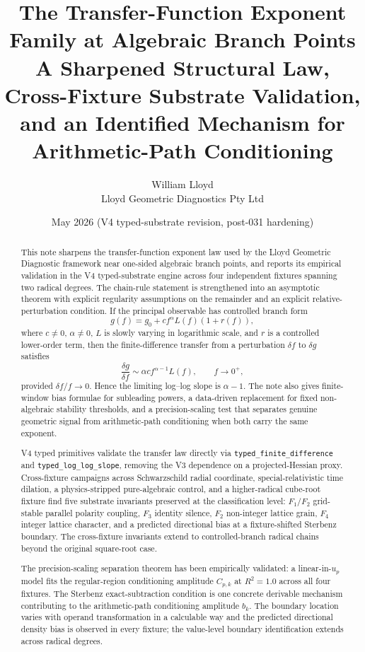 \documentclass[11pt,a4paper]{article}
\title{The Transfer-Function Exponent Family at Algebraic Branch Points\\
\large A Sharpened Structural Law, Cross-Fixture Substrate Validation,\\
and an Identified Mechanism for Arithmetic-Path Conditioning}
\author{William Lloyd\\\small Lloyd Geometric Diagnostics Pty Ltd}
\date{May 2026 (V4 typed-substrate revision, post-031 hardening)}
\begin{document}
\maketitle

\begin{abstract}
\noindent
This note sharpens the transfer-function exponent law used by the Lloyd Geometric Diagnostic framework near one-sided algebraic branch points, and reports its empirical validation in the V4 typed-substrate engine across four independent fixtures spanning two radical degrees. The chain-rule statement is strengthened into an asymptotic theorem with explicit regularity assumptions on the remainder and an explicit relative-perturbation condition. If the principal observable has controlled branch form
\[
    g(f)=g_0+c f^{\alpha}L(f)(1+r(f)),
\]
where $c\ne0$, $\alpha\ne0$, $L$ is slowly varying in logarithmic scale, and $r$ is a controlled lower-order term, then the finite-difference transfer from a perturbation $\delta f$ to $\delta g$ satisfies
\[
    \frac{\delta g}{\delta f}\sim \alpha c f^{\alpha-1}L(f),
    \qquad f\to0^+,
\]
provided $\delta f/f\to0$. Hence the limiting log--log slope is $\alpha-1$. The note also gives finite-window bias formulae for subleading powers, a data-driven replacement for fixed non-algebraic stability thresholds, and a precision-scaling test that separates genuine geometric signal from arithmetic-path conditioning when both carry the same exponent.

V4 typed primitives validate the transfer law directly via \texttt{typed\_finite\_difference} and \texttt{typed\_log\_log\_slope}, removing the V3 dependence on a projected-Hessian proxy. Cross-fixture campaigns across Schwarzschild radial coordinate, special-relativistic time dilation, a physics-stripped pure-algebraic control, and a higher-radical cube-root fixture find five substrate invariants preserved at the classification level: $F_1/F_2$ grid-stable parallel polarity coupling, $F_3$ identity silence, $F_2$ non-integer lattice grain, $F_4$ integer lattice character, and a predicted directional bias at a fixture-shifted Sterbenz boundary. The cross-fixture invariants extend to controlled-branch radical chains beyond the original square-root case.

The precision-scaling separation theorem has been empirically validated: a linear-in-$u_p$ model fits the regular-region conditioning amplitude $C_{p,k}$ at $R^2 = 1.0$ across all four fixtures. The Sterbenz exact-subtraction condition is one concrete derivable mechanism contributing to the arithmetic-path conditioning amplitude $b_k$. The boundary location varies with operand transformation in a calculable way and the predicted directional density bias is observed in every fixture; the value-level boundary identification extends across radical degrees.


\end{abstract}
\end{document}
